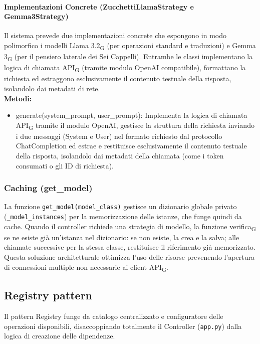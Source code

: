 \documentclass[11pt,a4paper]{article}
\newcommand{\gls}[1]{#1\textsubscript{G}}
\begin{document}
\paragraph{Implementazioni Concrete (ZucchettiLlamaStrategy e Gemma3Strategy)}
Il sistema prevede due implementazioni concrete che espongono in modo polimorfico i modelli \gls{Llama 3.2} (per operazioni standard e traduzioni) e \gls{Gemma 3} (per il pensiero laterale dei Sei Cappelli).
Entrambe le classi implementano la logica di chiamata \gls{API} (tramite modulo OpenAI compatibile), formattano la richiesta ed estraggono esclusivamente il contenuto testuale della risposta, isolandolo dai metadati di rete.\\
\textbf{Metodi:}
\begin{itemize}
    \item generate(system\_prompt, user\_prompt): Implementa la logica di chiamata \gls{API} tramite il modulo OpenAI, gestisce la struttura della richiesta inviando i due messaggi (System e User) nel formato richiesto dal protocollo ChatCompletion ed estrae e restituisce esclusivamente il contenuto testuale della risposta, isolandolo dai metadati della chiamata (come i token consumati o gli ID di richiesta).
\end{itemize}

\subsubsection{Caching (get\_model)}
La funzione \texttt{get\_model(model\_class)} gestisce un dizionario globale privato (\texttt{\_model\_instances}) per la memorizzazione delle istanze, che funge quindi da cache.
Quando il controller richiede una strategia di modello, la funzione \gls{verifica} se ne esiste già un'istanza nel dizionario: se non esiste, la crea e la salva; alle chiamate successive per la stessa classe, restituisce il riferimento già memorizzato. 
Questa soluzione architetturale ottimizza l'uso delle risorse prevenendo l'apertura di connessioni multiple non necessarie ai client \gls{API}.


\newpage

\subsection{Registry pattern}
Il pattern Registry funge da catalogo centralizzato e configuratore delle operazioni disponibili, disaccoppiando totalmente il Controller (\texttt{app.py}) dalla logica di creazione delle dipendenze.
\end{document}
